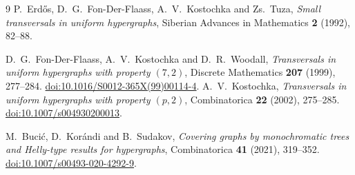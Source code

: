\documentclass[11pt]{article}
\numberwithin{equation}{section}
\theoremstyle{definition}
\theoremstyle{remark}
\begin{document}
\begin{thebibliography}{9}
P.~Erd\H{o}s, D.~G.~Fon-Der-Flaass, A.~V.~Kostochka and Zs.~Tuza,
\emph{Small transversals in uniform hypergraphs},
Siberian Advances in Mathematics \textbf{2} (1992), 82--88.

D.~G.~Fon-Der-Flaass, A.~V.~Kostochka and D.~R.~Woodall,
\emph{Transversals in uniform hypergraphs with property $(7,2)$},
Discrete Mathematics \textbf{207} (1999), 277--284.
\href{https://doi.org/10.1016/S0012-365X(99)00114-4}
{doi:10.1016/S0012-365X(99)00114-4}.
A.~V.~Kostochka,
\emph{Transversals in uniform hypergraphs with property $(p,2)$},
Combinatorica \textbf{22} (2002), 275--285.
\href{https://doi.org/10.1007/s004930200013}{doi:10.1007/s004930200013}.

M.~Buci\'c, D.~Kor\'andi and B.~Sudakov,
\emph{Covering graphs by monochromatic trees and Helly-type results
for hypergraphs}, Combinatorica \textbf{41} (2021), 319--352.
\href{https://doi.org/10.1007/s00493-020-4292-9}
{doi:10.1007/s00493-020-4292-9}.
\end{thebibliography}
\end{document}

